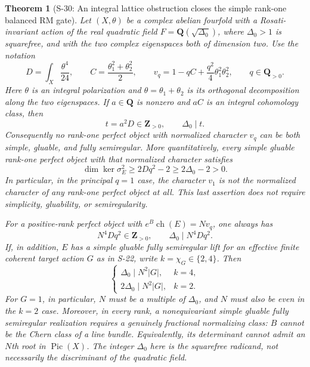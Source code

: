 \documentclass[11pt,a4paper]{article}
\newtheorem{theorem}{Theorem}[section]
\theoremstyle{definition}
\begin{document}
\begin{theorem}[S-30: An integral lattice obstruction closes the simple rank-one balanced RM gate]
\label{thm:semireg-rm-integral-obstruction}
Let $(X,\theta)$ be a complex abelian fourfold with a
Rosati-invariant action of the real quadratic field
$F=\mathbf Q(\sqrt{\Delta_0})$, where $\Delta_0>1$ is
squarefree, and with the two complex eigenspaces both
of dimension two. Use the notation
\[
 D=\int_X\frac{\theta^4}{24},\qquad
 C=\frac{\theta_1^2+\theta_2^2}{2},\qquad
 v_q=1-qC+\frac{q^2}{4}\theta_1^2\theta_2^2,
 \qquad q\in\mathbf Q_{>0}.
\]
Here $\theta$ is an integral polarization and
$\theta=\theta_1+\theta_2$ is its orthogonal decomposition
along the two eigenspaces.
If $a\in\mathbf Q$ is nonzero and $aC$ is an integral
cohomology class, then
\[
 t=a^2D\in\mathbf Z_{>0},\qquad \Delta_0\mid t.
 \tag{S30.1}
\]
Consequently no rank-one perfect object with normalized
character $v_q$ can be both simple, gluable, and fully
semiregular. More quantitatively, every simple gluable
rank-one perfect object with that normalized character
satisfies
\[
 \dim\ker\sigma_E^2\ge2Dq^2-2\ge2\Delta_0-2>0.
 \tag{S30.2}
\]
In particular, in the principal $q=1$ case, the character
$v_1$ is not the normalized character of any rank-one
perfect object at all. This last assertion does not
require simplicity, gluability, or semiregularity.

For a positive-rank perfect object with
$e^B\operatorname{ch}(E)=Nv_q$, one always has
\[
 N^4Dq^2\in\mathbf Z_{>0},\qquad
 \Delta_0\mid N^4Dq^2.
 \tag{S30.3}
\]
If, in addition, $E$ has a simple gluable fully semiregular
lift for an effective finite coherent target action $G$
as in S-22, write $k=\chi_G\in\{2,4\}$. Then
\[
 \begin{cases}
 \Delta_0\mid N^2|G|,&k=4,\\
 2\Delta_0\mid N^2|G|,&k=2.
 \end{cases}
 \tag{S30.4}
\]
For $G=1$, in particular, $N$ must be a multiple of
$\Delta_0$, and $N$ must also be even in the $k=2$ case.
Moreover, in every rank, a nonequivariant simple gluable
fully semiregular realization requires a genuinely
fractional normalizing class: $B$ cannot be the Chern
class of a line bundle. Equivalently, its determinant
cannot admit an $N$th root in $\operatorname{Pic}(X)$.
The integer $\Delta_0$ here is the squarefree radicand,
not necessarily the discriminant of the quadratic field.
\end{theorem}
\end{document}
